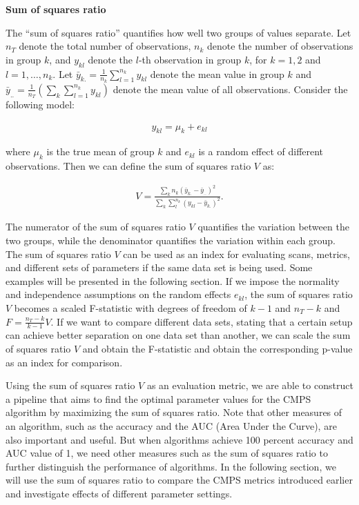 \textbf{Sum of squares ratio}

The ``sum of squares ratio'' quantifies how well two groups of values
separate. Let \(n_T\) denote the total number of observations, \(n_k\)
denote the number of observations in group \(k\), and \(y_{kl}\) denote
the \(l\)-th observation in group \(k\), for \(k = 1,2\) and
\(l = 1, \dots, n_k\). Let
\(\bar{y}_{k.} = \frac{1}{n_k} \sum_{l=1}^{n_k} y_{kl}\) denote the mean
value in group \(k\) and
\(\bar{y}_{..} = \frac{1}{n_T} \left( \sum_{k} \sum_{l = 1}^{n_k} y_{kl} \right)\)
denote the mean value of all observations. Consider the following model:

\begin{align}
y_{kl} = \mu_k + e_{kl}
\end{align}

where \(\mu_k\) is the true mean of group \(k\) and \(e_{kl}\) is a
random effect of different observations. Then we can define the sum of
squares ratio \(V\) as:

\begin{align}
V = \frac{\sum_k n_k (\bar{y}_{k.} - \bar{y}_{..})^2}{\sum_k \sum_l^{n_k} (y_{kl} - \bar{y}_{k.})^2 }.
\end{align}

The numerator of the sum of squares ratio \(V\) quantifies the variation
between the two groups, while the denominator quantifies the variation
within each group. The sum of squares ratio \(V\) can be used as an
index for evaluating scans, metrics, and different sets of parameters if
the same data set is being used. Some examples will be presented in the
following section. If we impose the normality and independence
assumptions on the random effects \(e_{kl}\), the sum of squares ratio
\(V\) becomes a scaled F-statistic with degrees of freedom of \(k-1\)
and \(n_T - k\) and \(F = \frac{n_T - k}{k- 1} V\). If we want to
compare different data sets, stating that a certain setup can achieve
better separation on one data set than another, we can scale the sum of
squares ratio \(V\) and obtain the F-statistic and obtain the
corresponding p-value as an index for comparison.

Using the sum of squares ratio \(V\) as an evaluation metric, we are
able to construct a pipeline that aims to find the optimal parameter
values for the CMPS algorithm by maximizing the sum of squares ratio.
Note that other measures of an algorithm, such as the accuracy and the
AUC (Area Under the Curve), are also important and useful. But when
algorithms achieve 100 percent accuracy and AUC value of 1, we need
other measures such as the sum of squares ratio to further distinguish
the performance of algorithms. In the following section, we will use the
sum of squares ratio to compare the CMPS metrics introduced earlier and
investigate effects of different parameter settings.

